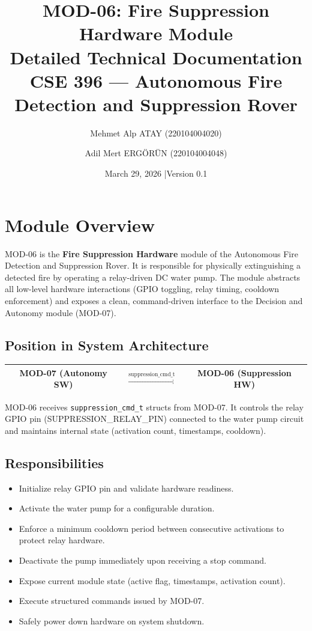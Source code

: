 \documentclass[12pt]{article}
\title{\textbf{MOD-06: Fire Suppression Hardware Module}\\[0.4em]
       \large Detailed Technical Documentation\\[0.3em]
       \normalsize CSE 396 --- Autonomous Fire Detection and Suppression Rover}
\author{Mehmet Alp ATAY (220104004020) \and Adil Mert ERG\"{O}R\"{U}N (220104004048)}
\date{March 29, 2026 \quad|\quad Version 0.1}
\begin{document}

\maketitle
\tableofcontents
\newpage

\section{Module Overview}

MOD-06 is the \textbf{Fire Suppression Hardware} module of the Autonomous Fire Detection and Suppression Rover. It is responsible for physically extinguishing a detected fire by operating a relay-driven DC water pump. The module abstracts all low-level hardware interactions (GPIO toggling, relay timing, cooldown enforcement) and exposes a clean, command-driven interface to the Decision and Autonomy module (MOD-07).

\subsection{Position in System Architecture}

\begin{center}
\small
\begin{tabular}{|c|c|c|}
\hline
\textbf{MOD-07 (Autonomy SW)} & $\xrightarrow{\text{suppression\_cmd\_t}}$ & \textbf{MOD-06 (Suppression HW)} \\
\hline
\end{tabular}
\end{center}

MOD-06 receives \texttt{suppression\_cmd\_t} structs from MOD-07. It controls the relay GPIO pin (SUPPRESSION\_RELAY\_PIN) connected to the water pump circuit and maintains internal state (activation count, timestamps, cooldown).

\subsection{Responsibilities}

\begin{itemize}[leftmargin=1.5em]
  \item Initialize relay GPIO pin and validate hardware readiness.
  \item Activate the water pump for a configurable duration.
  \item Enforce a minimum cooldown period between consecutive activations to protect relay hardware.
  \item Deactivate the pump immediately upon receiving a stop command.
  \item Expose current module state (active flag, timestamps, activation count).
  \item Execute structured commands issued by MOD-07.
  \item Safely power down hardware on system shutdown.
\end{itemize}
\end{document}
